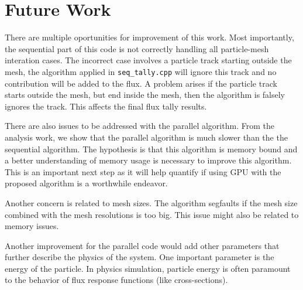 \section{Future Work}
There are multiple oportunities for improvement of this work. Most importantly, 
the sequential part of this code is not correctly handling all particle-mesh
interation cases. The incorrect case involves a particle track starting 
outside the mesh, the algorithm applied in \texttt{seq\_tally.cpp} will ignore this 
track and no contribution will be added to the flux.
A problem arises if the particle track starts outside the mesh, but end inside the mesh, 
then the algorithm is falsely ignores the track. This affects the final flux
tally results.

There are also issues to be addressed with the parallel algorithm. 
From the analysis work, we show that the parallel algorithm is much slower than the 
the sequential algorithm. The hypothesis is that this algorithm is memory 
bound and a better understanding of memory usage is necessary to improve 
this algorithm. This is an important next step as it will help quantify if using GPU 
with the proposed algorithm is a worthwhile endeavor.  

Another concern is related to mesh sizes. The algorithm segfaults if the mesh size 
combined with the mesh resolutions is too big. This issue might also be related to 
memory issues.

Another improvement for the parallel code would add other parameters that
further describe the physics of the system. One important parameter is the 
energy of the particle. In physics simulation, particle energy is often
paramount to the behavior of flux response functions (like
cross-sections).

